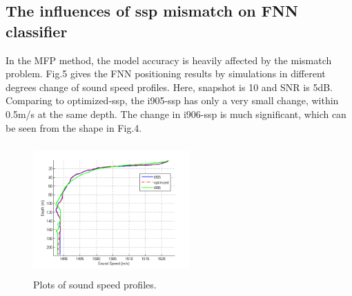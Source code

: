 \subsection{The influences of ssp mismatch on FNN classifier}
In the MFP method, the model accuracy is heavily affected by the mismatch problem\cite{tolstoy1989sensitivity,feuillade1989environmental,del1988effects}. Fig.5 gives the FNN positioning results by simulations in different degrees change of sound speed profiles. Here, snapshot is 10 and SNR is 5dB.
Comparing to optimized-ssp, the i905-ssp has only a very small change, within 0.5m/s at the same depth. The change in i906-ssp is much significant, which can be seen from the shape in Fig.4.
\begin{figure}
\includegraphics[width=6cm,height=5cm]{figure/ssp3}
\caption{Plots of sound speed profiles.}
\end{figure}

